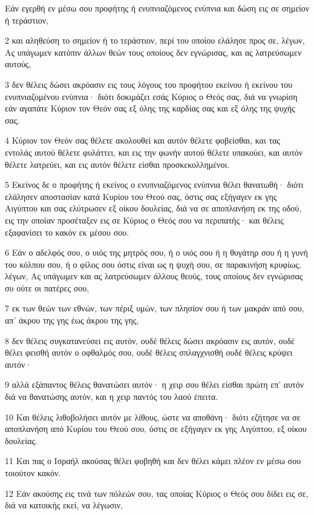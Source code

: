 \par Εάν εγερθή εν μέσω σου προφήτης ή ενυπνιαζόμενος ενύπνια και δώση εις σε σημείον ή τεράστιον,
\par 2 και αληθεύση το σημείον ή το τεράστιον, περί του οποίου ελάλησε προς σε, λέγων, Ας υπάγωμεν κατόπιν άλλων θεών τους οποίους δεν εγνώρισας, και ας λατρεύσωμεν αυτούς,
\par 3 δεν θέλεις δώσει ακρόασιν εις τους λόγους του προφήτου εκείνου ή εκείνου του ενυπνιαζομένου ενύπνια· διότι δοκιμάζει εσάς Κύριος ο Θεός σας, διά να γνωρίση εάν αγαπάτε Κύριον τον Θεόν σας εξ όλης της καρδίας σας και εξ όλης της ψυχής σας.
\par 4 Κύριον τον Θεόν σας θέλετε ακολουθεί και αυτόν θέλετε φοβείσθαι, και τας εντολάς αυτού θέλετε φυλάττει, και εις την φωνήν αυτού θέλετε υπακούει, και αυτόν θέλετε λατρεύει, και εις αυτόν θέλετε είσθαι προσκεκολλημένοι.
\par 5 Εκείνος δε ο προφήτης ή εκείνος ο ενυπνιαζόμενος ενύπνια θέλει θανατωθή· διότι ελάλησεν αποστασίαν κατά Κυρίου του Θεού σας, όστις σας εξήγαγεν εκ γης Αιγύπτου και σας ελύτρωσεν εξ οίκου δουλείας, διά να σε αποπλανήση εκ της οδού, εις την οποίαν προσέταξεν εις σε Κύριος ο Θεός σου να περιπατής· και θέλεις εξαφανίσει το κακόν εκ μέσου σου.
\par 6 Εάν ο αδελφός σου, ο υιός της μητρός σου, ή ο υιός σου ή η θυγάτηρ σου ή η γυνή του κόλπου σου, ή ο φίλος σου όστις είναι ως η ψυχή σου, σε παρακινήση κρυφίως, λέγων, Ας υπάγωμεν και ας λατρεύσωμεν άλλους θεούς, τους οποίους δεν εγνώρισας συ ούτε οι πατέρες σου,
\par 7 εκ των θεών των εθνών, των πέριξ υμών, των πλησίον σου ή των μακράν από σου, απ' άκρου της γης έως άκρου της γης,
\par 8 δεν θέλεις συγκατανεύσει εις αυτόν, ουδέ θέλεις δώσει ακρόασιν εις αυτόν, ουδέ θέλει φεισθή αυτόν ο οφθαλμός σου, ουδέ θέλεις σπλαγχνισθή ουδέ θέλεις κρύψει αυτόν·
\par 9 αλλά εξάπαντος θέλεις θανατώσει αυτόν· η χειρ σου θέλει είσθαι πρώτη επ' αυτόν διά να θανατώσης αυτόν, και η χειρ παντός του λαού έπειτα.
\par 10 Και θέλεις λιθοβολήσει αυτόν με λίθους, ώστε να αποθάνη· διότι εζήτησε να σε αποπλανήση από Κυρίου του Θεού σου, όστις σε εξήγαγεν εκ γης Αιγύπτου, εξ οίκου δουλείας.
\par 11 Και πας ο Ισραήλ ακούσας θέλει φοβηθή και δεν θέλει κάμει πλέον εν μέσω σου τοιούτον κακόν.
\par 12 Εάν ακούσης εις τινά των πόλεών σου, τας οποίας Κύριος ο Θεός σου δίδει εις σε, διά να κατοικής εκεί, να λέγωσιν,
